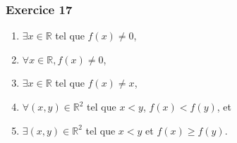 \documentclass[10pt,notheorems]{beamer}
\theoremstyle{plain}
\theoremstyle{definition} %
\begin{document}
\begin{frame}
  \frametitle{Exercice 17}
  \fontsize{8}{10}\selectfont

  \begin{enumerate}
  \item $\exists x\in\mathbb R$ tel que $f(x)\neq 0$,\newline
  \item $\forall x\in\mathbb R, f(x)\neq 0$,\newline
  \item $\exists x\in\mathbb R$ tel que $f(x)\neq x$,\newline
  \item $\forall (x,y)\in\mathbb R^2$ tel que $x<y$, $f(x)<f(y)$, et\newline
  \item $\exists (x,y)\in\mathbb R^2$ tel que $x<y$ et $f(x)\geq f(y)$.
  \end{enumerate}

\end{frame}
\end{document}
